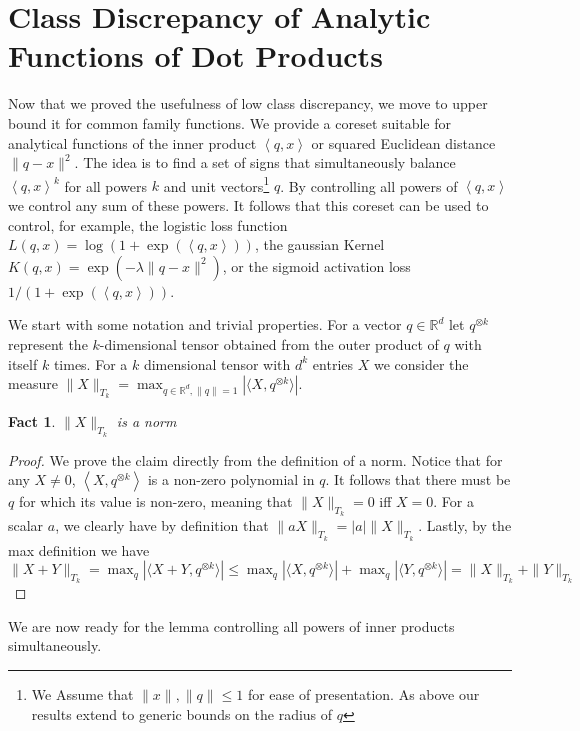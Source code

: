 \documentclass[12pt]{colt2019} %
\newtheorem{fact}[theorem]{Fact}
\newcommand{\ip}[1]{\left \langle #1 \right \rangle}
\newcommand{\R}{\mathbb{R}}
\begin{document}
{\section{Class Discrepancy of Analytic Functions of Dot Products} \label{sec:analytic}

Now that we proved the usefulness of low class discrepancy, we move to upper bound it for common family functions. We provide a coreset suitable for analytical functions of the inner product $\ip{q,x}$ or squared Euclidean distance $\|q-x\|^2$. 
%
The idea is to find a set of signs that simultaneously balance $\ip{q,x}^k$ for all powers $k$ and unit vectors\footnote{We Assume that $\|x\|,\|q\| \leq 1$ for ease of presentation. As above our results extend to generic bounds on the radius of $q$} $q$. By controlling all powers of $\ip{q,x}$ we control any sum of these powers. It follows that this coreset can be used to control, for example, the logistic loss function $L(q,x) = \log(1+\exp(\ip{q,x}))$, the gaussian Kernel $K(q,x) = \exp(-\lambda \|q-x\|^2)$, or the sigmoid activation loss $1/(1 + \exp(\ip{q,x}))$.

We start with some notation and trivial properties. 
For a vector $q \in \R^d$ let $q^{\otimes k}$ represent the $k$-dimensional tensor obtained from the outer product of $q$ with itself $k$ times. For a $k$ dimensional tensor with $d^k$ entries $X$ we consider the measure
$\|X\|_{T_k} = \max_{q \in \R^d, \|q\|=1} \left| \langle X, q^{\otimes k}\rangle \right|$.
\begin{fact}
$\|X\|_{T_k}$ is a norm
\end{fact}
\begin{proof}
We prove the claim directly from the definition of a norm.
Notice that for any $X \neq 0$, $\ip{X, q^{\otimes k}}$ is a non-zero polynomial in $q$. It follows that there must be $q$ for which its value is non-zero, meaning that $\|X\|_{T_k}=0$ iff $X=0$. For a scalar $a$, we clearly have by definition that
$\|aX\|_{T_k} = |a|\|X\|_{T_k}$.  Lastly, by the max definition we  have
$ \|X+Y\|_{T_k} =  \max_q \left| \langle X+Y, q^{\otimes k}\rangle \right| \leq 
\max_q \left| \langle X, q^{\otimes k}\rangle \right| + \max_q\left| \langle Y, q^{\otimes k}\rangle \right| = \|X\|_{T_k} + \|Y\|_{T_k}$
\end{proof}

We are now ready for the lemma controlling all powers of inner products simultaneously. 

}
\end{document}
